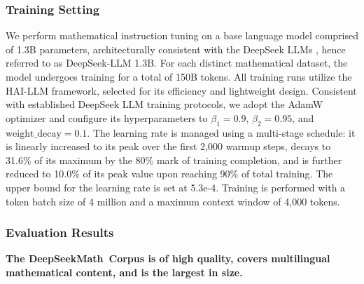 \begin{itemize}[topsep=0pt]
\subsubsection{Training Setting}
\label{sec:quality-policy}
We perform mathematical instruction tuning on a base language model comprised of 1.3B parameters, architecturally consistent with the DeepSeek LLMs \citep{deepseek-llm}, hence referred to as DeepSeek-LLM 1.3B. For each distinct mathematical dataset, the model undergoes training for a total of 150B tokens. All training runs utilize the HAI-LLM \citep{haillm} framework, selected for its efficiency and lightweight design. Consistent with established DeepSeek LLM training protocols, we adopt the AdamW optimizer \citep{adamW} and configure its hyperparameters to $\beta_1=0.9$, $\beta_2=0.95$, and $\mathrm{weight\_decay}=0.1$. The learning rate is managed using a multi-stage schedule: it is linearly increased to its peak over the first 2,000 warmup steps, decays to 31.6\% of its maximum by the 80\% mark of training completion, and is further reduced to 10.0\% of its peak value upon reaching 90\% of total training. The upper bound for the learning rate is set at 5.3e-4. Training is performed with a token batch size of 4 million and a maximum context window of 4,000 tokens.

\subsubsection{Evaluation Results}

\textbf{The DeepSeekMath~Corpus is of high quality, covers multilingual mathematical content, and is the largest in size.}


\end{itemize}
